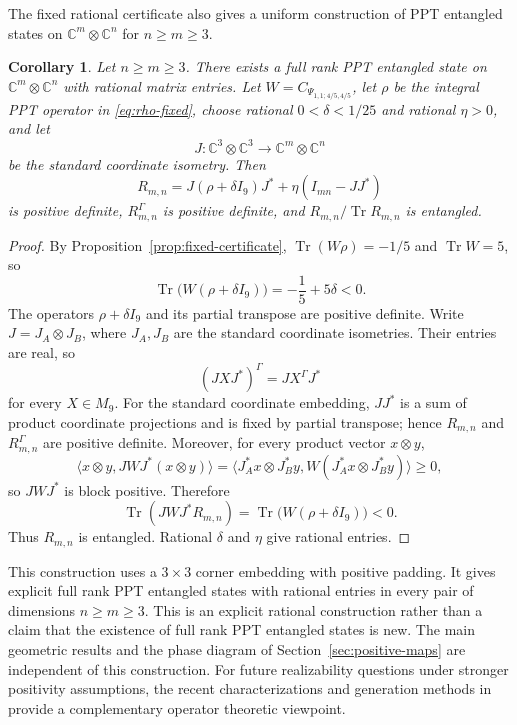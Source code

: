\documentclass[11pt]{amsart}
\newcommand{\chg}[1]{#1}
\newcommand{\newrev}[1]{#1}
\newcommand{\Tr}{\operatorname{Tr}}
\theoremstyle{plain}
\newtheorem{corollary}[theorem]{Corollary}
\theoremstyle{definition}
\theoremstyle{remark}
\begin{document}
The fixed rational certificate also gives a uniform construction of PPT entangled states on $\mathbb C^m\otimes\mathbb C^n$ for $n\ge m\ge3$.

\begin{corollary}\label{cor:full-rank-rational}
Let $n\ge m\ge3$. There exists a \chg{full rank} PPT entangled state on $\mathbb C^m\otimes\mathbb C^n$ with rational matrix entries. Let $W=C_{\Psi_{1,1;4/5,4/5}}$, let $\rho$ be the integral PPT operator in \eqref{eq:rho-fixed}, choose rational $0<\delta<1/25$ and rational $\eta>0$, and let
\[
J:\mathbb C^3\otimes\mathbb C^3\longrightarrow\mathbb C^m\otimes\mathbb C^n
\]
be the standard coordinate isometry. Then
\[
R_{m,n}=J(\rho+\delta I_9)J^*+\eta(I_{mn}-JJ^*)
\]
is positive definite, $R_{m,n}^\Gamma$ is positive definite, and $R_{m,n}/\Tr R_{m,n}$ is entangled.
\end{corollary}

\begin{proof}
By Proposition~\ref{prop:fixed-certificate}, $\Tr(W\rho)=-1/5$ and $\Tr W=5$, so
\[
\Tr\bigl(W(\rho+\delta I_9)\bigr)=-\frac15+5\delta<0.
\]
The operators $\rho+\delta I_9$ and its partial transpose are positive definite. Write $J=J_A\otimes J_B$, where $J_A,J_B$ are the standard coordinate isometries. Their entries are real, so
\[
(JXJ^*)^\Gamma=JX^\Gamma J^*
\]
for every $X\in M_9$. For the standard coordinate embedding, $JJ^*$ is a sum of product coordinate projections and is fixed by partial transpose; hence $R_{m,n}$ and $R_{m,n}^\Gamma$ are positive definite. \newrev{Moreover, for every product vector $x\otimes y$,}
\[
\newrev{\langle x\otimes y,JWJ^*(x\otimes y)\rangle=\langle J_A^*x\otimes J_B^*y,W(J_A^*x\otimes J_B^*y)\rangle\ge0,}
\]
\newrev{so $JWJ^*$ is block positive.} Therefore
\[
\Tr(JWJ^*R_{m,n})=\Tr\bigl(W(\rho+\delta I_9)\bigr)<0.
\]
Thus $R_{m,n}$ is entangled. Rational $\delta$ and $\eta$ give rational entries.
\end{proof}

This construction uses a $3\times3$ corner embedding with positive padding. It gives explicit \chg{full rank} PPT entangled states with rational entries in every pair of dimensions $n\ge m\ge3$. \chg{This is an explicit rational construction rather than a claim that the existence of full rank PPT entangled states is new.} The main geometric results and the phase diagram of Section~\ref{sec:positive-maps} are independent of this construction. For future realizability questions under stronger positivity assumptions, the recent characterizations and generation methods in \cite{vomEndeKhatriDenisov2025} provide a complementary \chg{operator theoretic} viewpoint.
\end{document}

